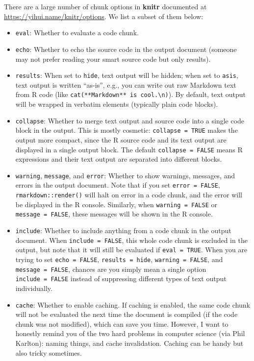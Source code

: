 \documentclass[
]{book}
\begin{document}
There are a large number of chunk options in \textbf{knitr} documented at \url{https://yihui.name/knitr/options}. We list a subset of them below:

\begin{itemize}
\item
  \texttt{eval}: Whether to evaluate a code chunk.
\item
  \texttt{echo}: Whether to echo the source code in the output document (someone may not prefer reading your smart source code but only results).
\item
  \texttt{results}: When set to \texttt{\textquotesingle{}hide\textquotesingle{}}, text output will be hidden; when set to \texttt{\textquotesingle{}asis\textquotesingle{}}, text output is written ``as-is'', e.g., you can write out raw Markdown text from R code (like \texttt{cat(\textquotesingle{}**Markdown**\ is\ cool.\textbackslash{}n\textquotesingle{})}). By default, text output will be wrapped in verbatim elements (typically plain code blocks).
\item
  \texttt{collapse}: Whether to merge text output and source code into a single code block in the output. This is mostly cosmetic: \texttt{collapse\ =\ TRUE} makes the output more compact, since the R source code and its text output are displayed in a single output block. The default \texttt{collapse\ =\ FALSE} means R expressions and their text output are separated into different blocks.
\item
  \texttt{warning}, \texttt{message}, and \texttt{error}: Whether to show warnings, messages, and errors in the output document. Note that if you set \texttt{error\ =\ FALSE}, \texttt{rmarkdown::render()} will halt on error in a code chunk, and the error will be displayed in the R console. Similarly, when \texttt{warning\ =\ FALSE} or \texttt{message\ =\ FALSE}, these messages will be shown in the R console.
\item
  \texttt{include}: Whether to include anything from a code chunk in the output document. When \texttt{include\ =\ FALSE}, this whole code chunk is excluded in the output, but note that it will still be evaluated if \texttt{eval\ =\ TRUE}. When you are trying to set \texttt{echo\ =\ FALSE}, \texttt{results\ =\ \textquotesingle{}hide\textquotesingle{}}, \texttt{warning\ =\ FALSE}, and \texttt{message\ =\ FALSE}, chances are you simply mean a single option \texttt{include\ =\ FALSE} instead of suppressing different types of text output individually.
\item
  \texttt{cache}: Whether to enable caching. If caching is enabled, the same code chunk will not be evaluated the next time the document is compiled (if the code chunk was not modified), which can save you time. However, I want to honestly remind you of the two hard problems in computer science (via Phil Karlton): naming things, and cache invalidation. Caching can be handy but also tricky sometimes.

\end{itemize}
\end{document}
